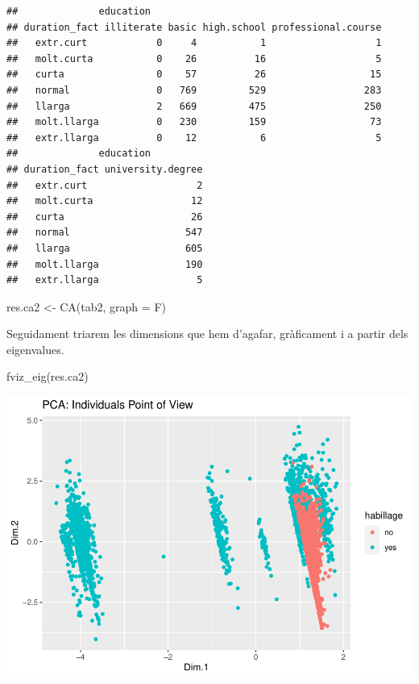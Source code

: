 \documentclass[
]{article}
\newenvironment{Shaded}{\begin{snugshade}}{\end{snugshade}}
\newcommand{\AttributeTok}[1]{\textcolor[rgb]{0.77,0.63,0.00}{#1}}
\newcommand{\FunctionTok}[1]{\textcolor[rgb]{0.00,0.00,0.00}{#1}}
\newcommand{\NormalTok}[1]{#1}
\newcommand{\OtherTok}[1]{\textcolor[rgb]{0.56,0.35,0.01}{#1}}
\begin{document}
\begin{verbatim}
##              education
## duration_fact illiterate basic high.school professional.course
##   extr.curt            0     4           1                   1
##   molt.curta           0    26          16                   5
##   curta                0    57          26                  15
##   normal               0   769         529                 283
##   llarga               2   669         475                 250
##   molt.llarga          0   230         159                  73
##   extr.llarga          0    12           6                   5
##              education
## duration_fact university.degree
##   extr.curt                   2
##   molt.curta                 12
##   curta                      26
##   normal                    547
##   llarga                    605
##   molt.llarga               190
##   extr.llarga                 5
\end{verbatim}

\begin{Shaded}
\begin{Highlighting}[]
\NormalTok{res.ca2 }\OtherTok{\textless{}{-}} \FunctionTok{CA}\NormalTok{(tab2, }\AttributeTok{graph =}\NormalTok{ F)}
\end{Highlighting}
\end{Shaded}

Seguidament triarem les dimensions que hem d'agafar, gràficament i a
partir dels eigenvalues.

\begin{Shaded}
\begin{Highlighting}[]
\FunctionTok{fviz\_eig}\NormalTok{(res.ca2)}
\end{Highlighting}
\end{Shaded}

\includegraphics{Entrega2_files/figure-latex/unnamed-chunk-7-1.pdf}
\end{document}
